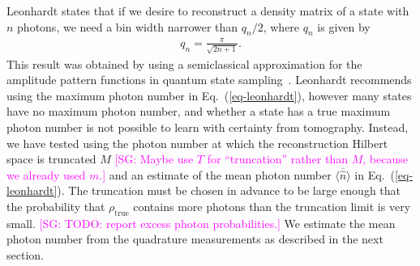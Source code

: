 \documentclass[
reprint,
superscriptaddress,
showpacs,
amsmath,
amssymb,
aps,
pra,
longbibliography
]{revtex4-1}
\providecommand{\aucmnt}[1]{#1}
\providecommand{\editcolor}[2]{\textcolor{#1}{#2}}
\providecommand{\aucmnt}[1]{}
\providecommand{\editcolor}[2]{#2}
\newcommand{\SGc}[1]{\aucmnt{\editcolor{magenta}{[SG: #1]}}}
\newcommand{\rhotrue}{\rho_{\text{true}}}
\begin{document}
Leonhardt states that if we desire to reconstruct a density matrix of
a state with $n$ photons, we need a bin width narrower than $q_n/2$,
where $q_n$ is given by
\begin{eqnarray}
  q_n = \frac{\pi}{\sqrt{2 n + 1}}.
  \label{eq-leonhardt}
\end{eqnarray}
This result was obtained by using a semiclassical approximation for
the amplitude pattern functions in quantum state
sampling~\cite{Leonhardt1996}. Leonhardt recommends using the maximum
photon number in Eq.~(\ref{eq-leonhardt}), however many states have no
maximum photon number, and whether a state has a true maximum photon
number is not possible to learn with certainty from tomography.
Instead, we have tested using the photon number at which the
reconstruction Hilbert space is truncated $M$ \SGc{Maybe use $T$ for
  ``truncation'' rather than $M$, because we already used $m$.} and an
estimate of the mean photon number
$\overline{\langle \hat{n} \rangle}$ in Eq.~(\ref{eq-leonhardt}).  The
truncation must be chosen in advance to be large enough that the
probability that $\rhotrue$ contains more photons than the truncation
limit is very small.  \SGc{TODO: report excess photon probabilities.}
We estimate the mean photon number from the quadrature measurements as
described in the next section.
\end{document}
